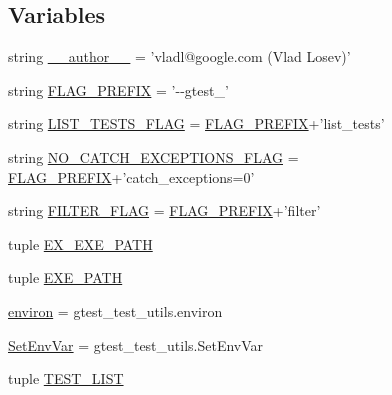 \subsection*{Variables}
\begin{DoxyCompactItemize}
\item 
string \hyperlink{namespacegtest__catch__exceptions__test_a26e1831a55209b037dc7d8d3ca1e4f32}{\-\_\-\-\_\-author\-\_\-\-\_\-} = 'vladl@google.\-com (Vlad Losev)'
\item 
string \hyperlink{namespacegtest__catch__exceptions__test_a2d40f89077ec9fdb51008c263148315f}{F\-L\-A\-G\-\_\-\-P\-R\-E\-F\-I\-X} = '-\/-\/gtest\-\_\-'
\item 
string \hyperlink{namespacegtest__catch__exceptions__test_a68601cbcd48065a2f656eb8552784f0c}{L\-I\-S\-T\-\_\-\-T\-E\-S\-T\-S\-\_\-\-F\-L\-A\-G} = \hyperlink{namespacegtest__catch__exceptions__test_a2d40f89077ec9fdb51008c263148315f}{F\-L\-A\-G\-\_\-\-P\-R\-E\-F\-I\-X}+'list\-\_\-tests'
\item 
string \hyperlink{namespacegtest__catch__exceptions__test_af3e2719448df6b24d78c870e5b586e8b}{N\-O\-\_\-\-C\-A\-T\-C\-H\-\_\-\-E\-X\-C\-E\-P\-T\-I\-O\-N\-S\-\_\-\-F\-L\-A\-G} = \hyperlink{namespacegtest__catch__exceptions__test_a2d40f89077ec9fdb51008c263148315f}{F\-L\-A\-G\-\_\-\-P\-R\-E\-F\-I\-X}+'catch\-\_\-exceptions=0'
\item 
string \hyperlink{namespacegtest__catch__exceptions__test_a1a53cfa4c10fe3bdbc85a14fd9692751}{F\-I\-L\-T\-E\-R\-\_\-\-F\-L\-A\-G} = \hyperlink{namespacegtest__catch__exceptions__test_a2d40f89077ec9fdb51008c263148315f}{F\-L\-A\-G\-\_\-\-P\-R\-E\-F\-I\-X}+'filter'
\item 
tuple \hyperlink{namespacegtest__catch__exceptions__test_a4789e6b786fb431c8f4e205ac93782b5}{E\-X\-\_\-\-E\-X\-E\-\_\-\-P\-A\-T\-H}
\item 
tuple \hyperlink{namespacegtest__catch__exceptions__test_a9176972ff83182f11532cbbc27f5cb42}{E\-X\-E\-\_\-\-P\-A\-T\-H}
\item 
\hyperlink{namespacegtest__catch__exceptions__test_ae51b794c28e667016c180f1b3fc85292}{environ} = gtest\-\_\-test\-\_\-utils.\-environ
\item 
\hyperlink{namespacegtest__catch__exceptions__test_a60be14c2b88aafb689ba4d3d2578449e}{Set\-Env\-Var} = gtest\-\_\-test\-\_\-utils.\-Set\-Env\-Var
\item 
tuple \hyperlink{namespacegtest__catch__exceptions__test_a47d343e41ab21971800091c7166f6129}{T\-E\-S\-T\-\_\-\-L\-I\-S\-T}
\item 

\end{DoxyCompactItemize}
